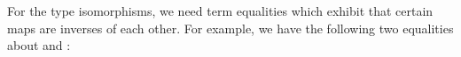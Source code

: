 \begin{AgdaAlign}
For the type isomorphisms, we need term equalities which exhibit that certain maps are inverses of each other.
For example, we have the following two equalities about  and :

\begin{code}%
%
\>[4]\AgdaSpace{}%
\AgdaSymbol{:}\AgdaSpace{}%
\AgdaSpace{}%
\AgdaSymbol{\{}\AgdaSymbol{\}}\AgdaSpace{}%
\AgdaSymbol{\{}\AgdaSymbol{\}}\AgdaSpace{}%
\AgdaSymbol{(}\AgdaSpace{}%
\AgdaSymbol{:}\AgdaSpace{}%
\AgdaSpace{}%
\AgdaSpace{}%
\AgdaSymbol{(}\AgdaSpace{}%
\AgdaSymbol{(}\AgdaSpace{}%
\AgdaSymbol{)))}\AgdaSpace{}%
\AgdaSpace{}%
\AgdaSpace{}%
\AgdaSpace{}%
\AgdaOperator{\AgdaFunction{\$}}\AgdaSpace{}%
\AgdaSymbol{(}\AgdaSpace{}%
\AgdaSpace{}%
\AgdaOperator{\AgdaFunction{\$}}\AgdaSpace{}%
\AgdaSymbol{)}\AgdaSpace{}%
\AgdaSpace{}%
\<%
\\
%
\>[4]\AgdaSpace{}%
\AgdaSymbol{:}\AgdaSpace{}%
\AgdaSpace{}%
\AgdaSymbol{\{}\AgdaSymbol{\}}\AgdaSpace{}%
\AgdaSymbol{\{}\AgdaSymbol{\}}\AgdaSpace{}%
\AgdaSymbol{(}\AgdaSpace{}%
\AgdaSymbol{:}\AgdaSpace{}%
\AgdaSpace{}%
\AgdaSpace{}%
\AgdaSymbol{)}\AgdaSpace{}%
\AgdaSpace{}%
\AgdaSpace{}%
\AgdaSpace{}%
\AgdaOperator{\AgdaFunction{\$}}\AgdaSpace{}%
\AgdaSymbol{(}\AgdaSpace{}%
\AgdaSpace{}%
\AgdaOperator{\AgdaFunction{\$}}\AgdaSpace{}%
\AgdaSymbol{)}\AgdaSpace{}%
\AgdaSpace{}%
\<%
\end{code}


\end{AgdaAlign}
